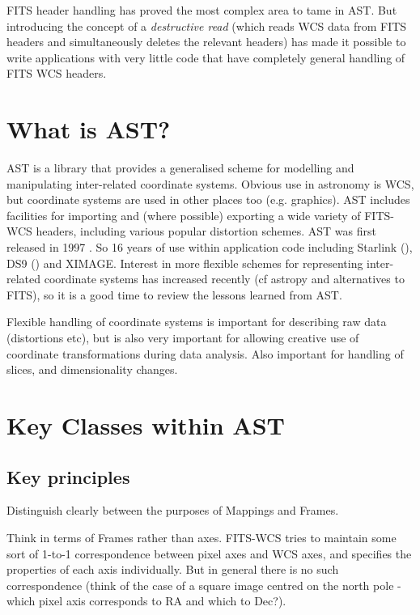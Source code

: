 \documentclass[final,authoryear,5p,times,twocolumn]{elsarticle}
\begin{document}
FITS header handling has proved the most complex area to tame in AST.
But introducing the concept of a \emph{destructive read} (which reads WCS
data from FITS headers and simultaneously deletes the relevant headers)
has made it possible to write applications with very little code that
have completely general handling of FITS WCS headers.

\section{What is AST?}

AST is a library that provides a generalised scheme for modelling and
manipulating inter-related coordinate systems. Obvious use in
astronomy is WCS, but coordinate systems are used in other places too
(e.g. graphics).  AST includes facilities for importing and (where
possible) exporting a wide variety of FITS-WCS headers, including
various popular distortion schemes. AST was first released in 1997
\cite[][included in ``Twenty Years of ADASS'' \nocite{adass20}]{1998ASPC..145...41W}.
So 16 years of use within application code including Starlink (), DS9 () and
XIMAGE. Interest in more flexible schemes for representing
inter-related coordinate systems has increased recently (cf astropy
and alternatives to FITS), so it is a good time to review the lessons
learned from AST.

Flexible handling of coordinate systems is important for describing
raw data (distortions etc), but is also very important for allowing
creative use of coordinate transformations during data analysis. Also
important for handling of slices, and dimensionality changes.

\section{Key Classes within AST}

\subsection{Key principles}

Distinguish clearly between the purposes of Mappings and Frames.

Think in terms of Frames rather than axes. FITS-WCS tries to maintain
some sort of 1-to-1 correspondence between pixel axes and WCS axes,
and specifies the properties of each axis individually. But in general
there is no such correspondence (think of the case of a square image
centred on the north pole - which pixel axis corresponds to RA and
which to Dec?).
\end{document}
